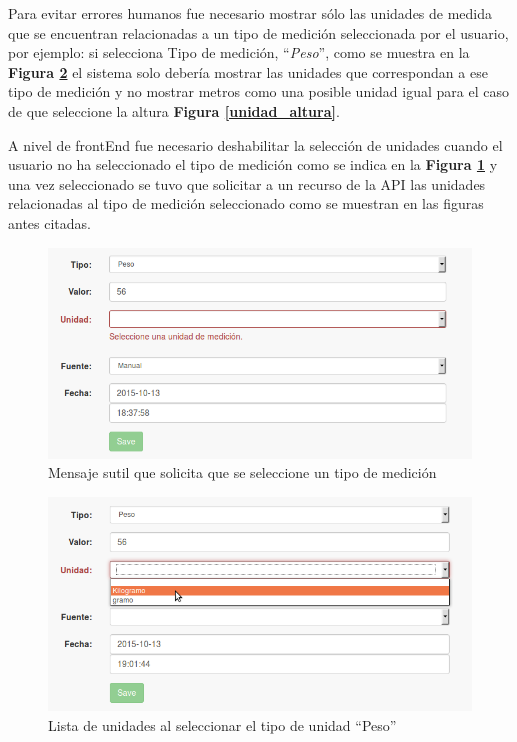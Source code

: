 Para evitar errores humanos fue necesario mostrar sólo las unidades de medida que se encuentran relacionadas a un tipo de medición seleccionada por el usuario, por ejemplo: si selecciona Tipo de medición, ``\textit{Peso}'', como se muestra en la \textbf{Figura \ref{unidad_peso}} el sistema solo debería mostrar las unidades que correspondan a ese tipo de medición y no mostrar metros como una posible unidad igual para el caso de que seleccione la altura  \textbf{Figura \ref{unidad_altura}}.

A nivel de frontEnd fue necesario deshabilitar  la selección de unidades cuando el usuario no ha seleccionado el tipo de medición como se indica en la \textbf{Figura \ref{msj_seleccione_tipo}} y una vez seleccionado se tuvo que solicitar a un recurso de la API las unidades relacionadas al tipo de medición seleccionado como se muestran en las figuras antes citadas.

 
 \begin{figure}[h!]
  \centering
  \includegraphics[width=.8\textwidth]{img/3-selecciona_tipo}
  \caption{Mensaje sutil que solicita que se seleccione un tipo de medición }
  \label{msj_seleccione_tipo}
\end{figure}

\begin{figure}[h!]
  \centering
  \includegraphics[width=.8\textwidth]{img/3-unidad_peso}
  \caption{Lista de unidades al seleccionar el tipo de unidad ``Peso''}
  \label{unidad_peso}
\end{figure}

